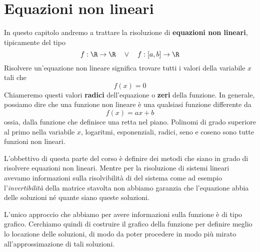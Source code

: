 \chapter{Equazioni non lineari}
In questo capitolo andremo a trattare la risoluzione di \textbf{equazioni non lineari}, tipicamente del tipo
\[ f : \R \to \R \quad \vee \quad f : [a, b] \to \R \]
Risolvere un'equazione non lineare significa trovare tutti i valori della variabile $x$ tali che
\[ f(x) = 0 \]
Chiameremo questi valori \textbf{radici} dell'equazione o \textbf{zeri} della funzione. In generale, possiamo
dire che una funzione non lineare è una qualsiasi funzione differente da
\[ f(x) = a x + b \]
ossia, dalla funzione che definisce una retta nel piano. Polinomi di grado superiore al primo nella variabile
$x$, logaritmi, esponenziali, radici, seno e coseno sono tutte funzioni non lineari.

L'obbettivo di questa parte del corso è definire dei metodi che siano in grado di risolvere equazioni non
lineari. Mentre per la risoluzione di sistemi lineari avevamo informazioni sulla risolvibilità di del sistema
come ad esempio l'\emph{invertibilità} della matrice stavolta non abbiamo garanzia che l'equazione abbia
delle soluzioni né quante siano queste soluzioni.

L'unico approccio che abbiamo per avere informazioni sulla funzione è di tipo grafico. Cerchiamo quindi di
costruire il grafico della funzione per definire meglio lo locazione delle soluzioni, di modo da poter procedere
in modo più mirato all'approssimazione di tali soluzioni.



